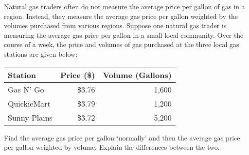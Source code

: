 \documentclass[11pt,letterpaper]{article}
\begin{document}
 Natural gas traders often do not measure the average price per gallon of gas in a region. Instead, they measure the average gas price per gallon weighted by the volumes purchased from various regions. Suppose one natural gas trader is measuring the average gas price per gallon in a small local community. Over the course of a week, the price and volumes of gas purchased at the three local gas stations are given below: \par
	\begin{table}[!ht]
	\centering
        \begin{tabular}{lrr} \hline
	Station & Price (\$) & Volume (Gallons) \\ \hline
	Gas N' Go & \$3.76 & 1,600 \\
	QuickieMart & \$3.79 & 1,200 \\
	Sunny Plains & \$3.72 & 5,200
        \end{tabular}
	\end{table} \par
Find the average gas price per gallon `normally' and then the average gas price per gallon weighted by volume. Explain the differences between the two. 
\end{document}
